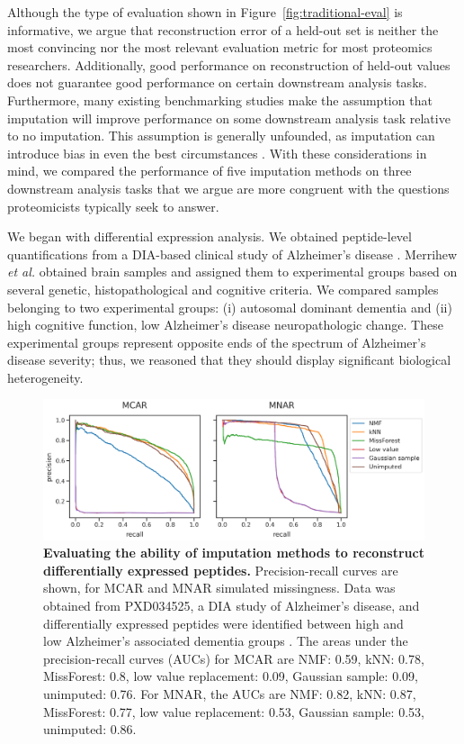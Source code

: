 \documentclass{article}
\begin{document}
Although the type of evaluation shown in Figure~\ref{fig:traditional-eval} is informative, we argue that reconstruction error of a held-out set is neither the most convincing nor the most relevant evaluation metric for most proteomics researchers. Additionally, good performance on reconstruction of held-out values does not guarantee good performance on certain downstream analysis tasks. Furthermore, many existing benchmarking studies make the assumption that imputation will improve performance on some downstream analysis task relative to no imputation. This assumption is generally unfounded, as imputation can introduce bias in even the best circumstances \cite{scRNAseq-false-signals, sc-impute-gene-networks}. With these considerations in mind, we compared the performance of five imputation methods on three downstream analysis tasks that we argue are more congruent with the questions proteomicists typically seek to answer.

We began with differential expression analysis. We obtained peptide-level quantifications from a DIA-based clinical study of Alzheimer's disease \cite{smtg-maccoss}. Merrihew \textit{et al.} obtained brain samples and assigned them to experimental groups based on several genetic, histopathological and cognitive criteria. We compared samples belonging to two experimental groups: (i) autosomal dominant dementia and (ii) high cognitive function, low Alzheimer's disease neuropathologic change. These experimental groups represent opposite ends of the spectrum of Alzheimer's disease severity; thus, we reasoned that they should display significant biological heterogeneity. 

\begin{figure}
  \centering
  \includegraphics[width=1.0\textwidth]{figures/DE-experiment-multipanel1.png}
  \caption{{\bf Evaluating the ability of imputation methods to reconstruct differentially expressed peptides.} Precision-recall curves are shown, for MCAR and MNAR simulated missingness. Data was obtained from PXD034525, a DIA study of Alzheimer's disease, and differentially expressed peptides were identified between high and low Alzheimer's associated dementia groups \cite{smtg-maccoss}. The areas under the precision-recall curves (AUCs) for MCAR are NMF: 0.59, kNN: 0.78, MissForest: 0.8, low value replacement: 0.09, Gaussian sample: 0.09, unimputed: 0.76. For MNAR, the AUCs are NMF: 0.82, kNN: 0.87, MissForest: 0.77, low value replacement: 0.53, Gaussian sample: 0.53, unimputed: 0.86.}
  \label{fig:PR-curves}
\end{figure}
 
\end{document}
